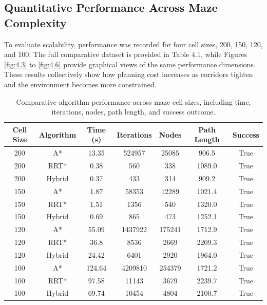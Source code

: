 \documentclass[a4paper,12pt,one side]{report}
\theoremstyle{definition}
\begin{document}
\begin{itemize}
\subsection{Quantitative Performance Across Maze Complexity}

To evaluate scalability, performance was recorded for four cell sizes, 200, 150, 120, and 100. The full comparative dataset is provided in Table 4.1, while Figures \ref{fig:4.3} to \ref{fig:4.6} provide graphical views of the same performance dimensions. These results collectively show how planning cost increases as corridors tighten and the environment becomes more constrained.

\begin{table}[h]
\centering
\caption{Comparative algorithm performance across maze cell sizes, including time, iterations, nodes, path length, and success outcome.}
\label{tab:4.1}
\begin{tabular}{|c|c|c|c|c|c|c|}
\hline
\textbf{Cell Size} & \textbf{Algorithm} & \textbf{Time (s)} & \textbf{Iterations} & \textbf{Nodes} & \textbf{Path Length} & \textbf{Success} \\
\hline
200 & A* & 13.35 & 524957 & 25085 & 906.5 & True \\
200 & RRT* & 0.38 & 560 & 338 & 1089.0 & True \\
200 & Hybrid & 0.37 & 433 & 314 & 909.2 & True \\
\hline
150 & A* & 1.87 & 58353 & 12289 & 1021.4 & True \\
150 & RRT* & 1.51 & 1356 & 540 & 1320.0 & True \\
150 & Hybrid & 0.69 & 865 & 473 & 1252.1 & True \\
\hline
120 & A* & 55.09 & 1437922 & 175241 & 1712.9 & True \\
120 & RRT* & 36.8 & 8536 & 2669 & 2209.3 & True \\
120 & Hybrid & 24.42 & 6401 & 2920 & 1964.0 & True \\
\hline
100 & A* & 124.64 & 4209810 & 254379 & 1721.2 & True \\
100 & RRT* & 97.58 & 11143 & 3679 & 2239.7 & True \\
100 & Hybrid & 69.74 & 10454 & 4804 & 2100.7 & True \\
\hline
\end{tabular}
\end{table}


\end{itemize}
\end{document}
